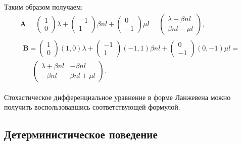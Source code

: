 \documentclass[floatfix,
showkeys,
twocolumn, nofootinbib, superscriptaddress, ]{revtex4-1}
\begin{document}
  Таким образом получаем:
\begin{equation} 
  \label{ft:4}
  \begin{gathered}
    \mathbf A =
    \begin{pmatrix}
      1\\
      0
    \end{pmatrix}
    \lambda +
    \begin{pmatrix}
      -1\\
      1
    \end{pmatrix}
    \beta n l +
    \begin{pmatrix}
      0\\
      -1
    \end{pmatrix}
    \mu l =
    \begin{pmatrix}
      \lambda - \beta n l\\
      \beta n l - \mu l
    \end{pmatrix}, \\
    \begin{multlined}
      \mathbf B =
      \begin{pmatrix}
        1\\
        0
      \end{pmatrix}
      (1,0) \lambda +
      \begin{pmatrix}
        -1\\
        1
      \end{pmatrix}
      (-1,1) \beta n l +
      \begin{pmatrix}
        0\\
        -1
      \end{pmatrix}
      (0,-1) \mu l = \\ =
      \begin{pmatrix}
        \lambda + \beta n l & - \beta n l \\
        - \beta n l & \beta n l + \mu l
      \end{pmatrix}.
    \end{multlined}
  \end{gathered}
\end{equation}

  Стохастическое дифференциальное уравнение в форме Ланжевена можно
  получить воспользовавшись соответствующей формулой.

  \subsection{Детерминистическое поведение}
\end{document}
